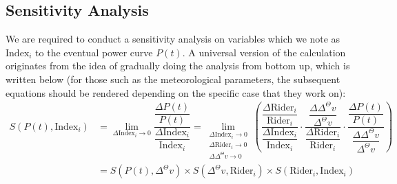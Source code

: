 \documentclass{article}
\begin{document}
		\subsection{Sensitivity Analysis}
			We are required to conduct a sensitivity analysis on variables which we note as \(\mathrm{Index}_i\) to the eventual power curve \(P(t)\). A universal version of the calculation originates from the idea of gradually doing the analysis from bottom up, which is written below (for those such as the meteorological parameters, the subsequent equations should be rendered depending on the specific case that they work on):
			\[
				\begin{aligned}
					S\left( P\left( t \right) ,\mathrm{Index}_i \right) &=\lim_{\Delta \mathrm{Index}_i\rightarrow 0} \dfrac{\dfrac{\Delta P\left( t \right)}{P\left( t \right)}}{\dfrac{\Delta \mathrm{Index}_i}{\mathrm{Index}_i}}=\lim\limits_{\substack{\Delta \mathrm{Index}_i\rightarrow 0 \\\Delta \mathrm{Rider}_i\rightarrow 0\\\Delta\Delta^{\Theta}v\rightarrow 0}} \left( \dfrac{\dfrac{\Delta \mathrm{Rider}_i}{\mathrm{Rider}_i}}{\dfrac{\Delta \mathrm{Index}_i}{\mathrm{Index}_i}}\cdot \dfrac{\dfrac{\Delta \Delta ^{\Theta}v}{\Delta ^{\Theta}v}}{\dfrac{\Delta \mathrm{Rider}_i}{\mathrm{Rider}_i}}\cdot \dfrac{\dfrac{\Delta P\left( t \right)}{P\left( t \right)}}{\dfrac{\Delta \Delta ^{\Theta}v}{\Delta ^{\Theta}v}} \right) \\
					&=S\left( P\left( t \right) ,\Delta ^{\Theta}v \right) \times S\left( \Delta ^{\Theta}v,\mathrm{Rider}_i \right) \times S\left( \mathrm{Rider}_i,\mathrm{Index}_i \right)
				\end{aligned}
			\]
\end{document}
